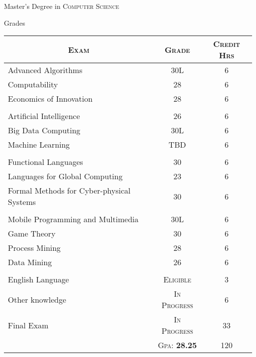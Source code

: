 \documentclass[a4paper,10pt]{article}
\begin{document}
\newpage
\par{\centering\Large \hypertarget{mrds}{Master's Degree in \textsc{Computer Science}} \par}\large{\centering Grades\par}\normalsize
\begin{center}
\begin{tabular}{lcc}
\multicolumn{1}{c}{\textsc{Exam}}&\textsc{Grade}&\textsc{Credit Hrs}\\ \hline
Advanced Algorithms	&30L&	6\\
Computability	&28& 6 \\
Economics of Innovation	&28	& 6\\ \\

Artificial Intelligence	&26& 6\\
Big Data Computing	&30L& 6\\
Machine Learning	&TBD&	6\\	\\

Functional Languages	&30& 6\\
Languages for Global Computing &23&6\\
Formal Methods for Cyber-physical Systems & 30 & 6\\ \\

Mobile Programming and Multimedia	&30L&	6\\
Game Theory	&30 &	6\\
Process Mining	&28 &	6\\
Data Mining	& 26 &	6\\ \\

English Language	& \textsc{Eligible} &	3\\
Other knowledge & \textsc{In Progress} & 6 \\
Final Exam	& \textsc{In Progress}	& 33 \\	
		\cline{2-3}
	&\textsc{Gpa: } \textbf{28.25} & 120 \\
\end{tabular}
\end{center}
\end{document}
